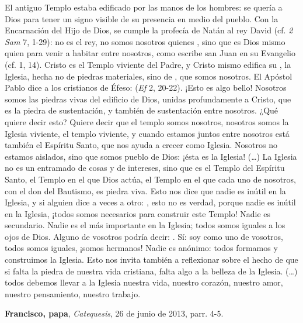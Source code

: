 \begin{patercite}
El antiguo Templo estaba edificado por las manos de los hombres: se quería  a Dios para tener un signo visible de su presencia en medio del pueblo. Con la Encarnación del Hijo de Dios, se cumple la profecía de Natán al rey David (cf. \emph{2 Sam} 7, 1-29): no es el rey, no somos nosotros quienes , sino que es Dios mismo quien  para venir a habitar entre nosotros, como escribe san Juan en su Evangelio (cf. 1, 14). Cristo es el Templo viviente del Padre, y Cristo mismo edifica su , la Iglesia, hecha no de piedras materiales, sino de , que somos nosotros. El Apóstol Pablo dice a los cristianos de Éfeso:  (\emph{Ef} 2, 20-22). ¡Esto es algo bello! Nosotros somos las piedras vivas del edificio de Dios, unidas profundamente a Cristo, que es la piedra de sustentación, y también de sustentación entre nosotros. ¿Qué quiere decir esto? Quiere decir que el templo somos nosotros, nosotros somos la Iglesia viviente, el templo viviente, y cuando estamos juntos entre nosotros está también el Espíritu Santo, que nos ayuda a crecer como Iglesia. Nosotros no estamos aislados, sino que somos pueblo de Dios: ¡ésta es la Iglesia! (\ldots) La Iglesia no es un entramado de cosas y de intereses, sino que es el Templo del Espíritu Santo, el Templo en el que Dios actúa, el Templo en el que cada uno de nosotros, con el don del Bautismo, es piedra viva. Esto nos dice que nadie es inútil en la Iglesia, y si alguien dice a veces a otro: , esto no es verdad, porque nadie es inútil en la Iglesia, ¡todos somos necesarios para construir este Templo! Nadie es secundario. Nadie es el más importante en la Iglesia; todos somos iguales a los ojos de Dios. Alguno de vosotros podría decir: . Sí: soy como uno de vosotros, todos somos iguales, ¡somos hermanos! Nadie es anónimo: todos formamos y construimos la Iglesia. Esto nos invita también a reflexionar sobre el hecho de que si falta la piedra de nuestra vida cristiana, falta algo a la belleza de la Iglesia. (\ldots) todos debemos llevar a la Iglesia nuestra vida, nuestro corazón, nuestro amor, nuestro pensamiento, nuestro trabajo.

\textbf{Francisco, papa}, \textit{Catequesis}, 26 de junio de 2013, parr. 4-5.
\end{patercite}




